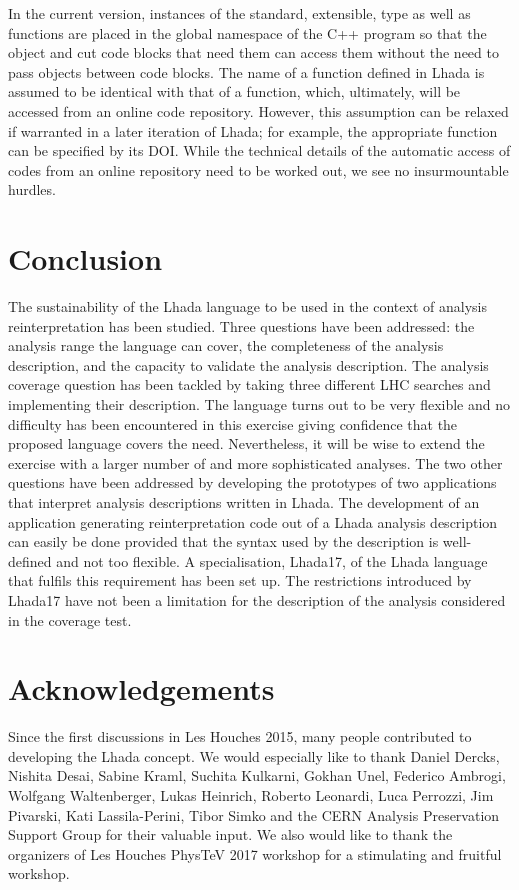 \documentclass[11pt]{cernrep}
\begin{document}
In the current version, instances of the standard, extensible, type as well as functions are placed in the global namespace of the C++ program so that the object and cut code blocks
that need them can access them without the need to pass objects between code blocks. The name of a function defined in {\sc Lhada} is assumed  to be identical with that of a function, which, ultimately, will be accessed from an online code repository. However, this assumption can be relaxed if warranted in a later iteration of {\sc Lhada}; for example, the appropriate function can be specified by its {\sc DOI}.  While the technical details of the automatic access of
codes from an online repository need to be worked out, we see no insurmountable hurdles.


\section{Conclusion}

The sustainability of the {\sc Lhada} language to be used in the context of analysis reinterpretation has been studied. Three questions have been addressed: the analysis range the language can cover, the completeness of the analysis description, and the capacity to validate the analysis description. The analysis coverage question has been tackled by taking three different LHC searches and implementing their description. The language turns out to be very flexible and no difficulty has been encountered in this exercise giving confidence that the proposed language covers the need. Nevertheless, it will be wise to extend the exercise with a larger number of and more sophisticated analyses. The two other questions have been addressed by developing the prototypes of two applications that interpret analysis descriptions written in {\sc Lhada}. The development of an application generating reinterpretation code out of a {\sc Lhada} analysis description can easily be done provided that the syntax used by the description is well-defined and not too flexible. A specialisation, {\sc Lhada17}, of the {\sc Lhada} language that fulfils this requirement has been set up. The restrictions introduced by {\sc Lhada17} have not been a limitation for the description of the analysis considered in the coverage test. 

\section*{Acknowledgements}

Since the first discussions in Les Houches 2015, many people contributed to developing the {\sc Lhada} concept.  
We would especially like to thank Daniel Dercks, Nishita Desai, Sabine Kraml, Suchita Kulkarni, Gokhan Unel, Federico Ambrogi, Wolfgang Waltenberger, Lukas Heinrich, Roberto Leonardi, Luca Perrozzi, Jim Pivarski, Kati Lassila-Perini, Tibor Simko and the CERN Analysis Preservation Support Group for their valuable input.  We also would like to thank the organizers of Les Houches PhysTeV 2017 workshop for a stimulating and fruitful workshop.
\end{document}
